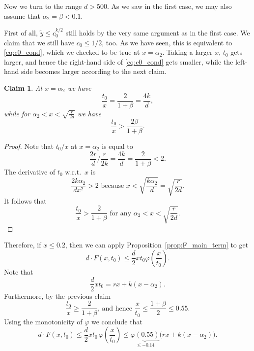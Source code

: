 \documentclass[12pt]{amsart}
\newtheorem*{claim*}{Claim}
\theoremstyle{definition}
\newcommand\ds{\displaystyle}
\newcommand\yt{\widetilde{y}}
\newcommand\al{\alpha}
\newcommand\be{\beta}
\begin{document}
Now we turn to the range $d>500$. As we saw in the first case, we may also assume that $\al_2=\be<0.1$. 

First of all, $\yt \leq c_0^{k/2}$ still holds by the very same argument as in the first case. We claim that we still have $c_0 \leq 1/2$, too. As we have seen, this is equivalent to \eqref{eq:c0_cond}, which we checked to be true at $x=\al_2$. Taking a larger $x$, $t_0$ gets larger, and hence the right-hand side of \eqref{eq:c0_cond} gets smaller, while the left-hand side becomes larger according to the next claim.
%
\begin{claim*}
At $x=\al_2$ we have 
%
\[ \frac{t_0}{x} = \frac{2}{1+\be} = \frac{4k}{d} ,\]
%
while for $\ds \al_2< x < \sqrt{ \frac{r}{2d}}$ we have 
%
\[ \frac{t_0}{x} > \frac{2\be}{1+\be} .\]
%
%
%
\end{claim*}
%
\begin{proof}
Note that $t_0/x$ at $x=\al_2$ is equal to 
%
\[ \frac{2r}{d} \bigg/ \frac{r}{2k} = \frac{4k}{d} 
= \frac{2}{1+\be} < 2.\] 
%
The derivative of $t_0$ w.r.t.~$x$ is 
%
\[ \frac{2k \al_2}{dx^2} > 2 \text{ because }
x < \sqrt{\frac{k \al_2}{d}} = \sqrt{\frac{r}{2d}} .\]
%
It follows that 
%
\[ \frac{t_0}{x} > \frac{2}{1+\be} 
\text{ for any } \al_2< x < \sqrt{ \frac{r}{2d}} .\]
%
%
%
\end{proof}
%

Therefore, if $x \leq 0.2$, then we can apply Proposition~\ref{prop:F_main_term} to get  
%
\[ d \cdot F(x,t_0) \leq 
\frac{d}{2} x t_0 \varphi\left( \frac{x}{t_0} \right) .\]
%
Note that 
%
\[ \frac{d}{2} x t_0 = rx + k(x-\al_2) .\]
%
Furthermore, by the previous claim  
%
\[ \frac{t_0}{x} \geq \frac{2}{1+\be} 
\text{, and hence } 
\frac{x}{t_0} \leq \frac{1+\be}{2} \leq 0.55 .\]
%
Using the monotonicity of $\varphi$ we conclude that 
%
\[ d \cdot F(x,t_0) \leq 
\frac{d}{2} x t_0 \, \varphi\left( \frac{x}{t_0} \right) 
\leq \underbrace{\varphi(0.55)}_{\leq - 0.14} 
\big( rx + k(x-\al_2) \big) .\]
%
\end{document}
